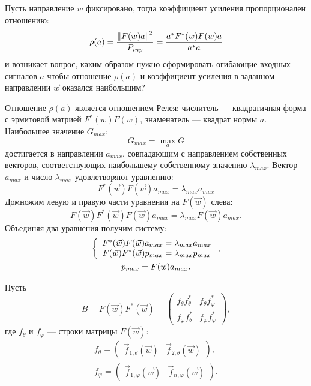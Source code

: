 Пусть направление $w$ фиксировано, тогда коэффициент усиления пропорционален отношению:
\[
    \rho(a)
    = \frac{\left \| F(w) a \right \|^2}{P_{inp}}
    = \frac{a^* F^*(w) F(w) a}{a^* a}
\]
и возникает вопрос, каким образом нужно сформировать огибающие входных сигналов $a$ чтобы отношение $\rho(a)$ и коэффициент усиления в заданном направлении $\vec{w}$
оказался наибольшим?

Отношение $\rho(a)$ является отношением Релея: числитель --- квадратичная форма с эрмитовой матрией $F^*(w) F(w)$, знаменатель --- квадрат нормы $a$.
Наибольшее значение $G_{max}$:
\[
    G_{max} = \max \limits_{a} G
\]
достигается в направлении $a_{max}$, совпадающим с направлением собственных векторов, соответствующих наибольшему собственному значению $\lambda_{max}$.
Вектор $a_{max}$ и число $\lambda_{max}$ удовлетворяют уравнению:
\[
    F^*(\vec{w}) F(\vec{w}) a_{max} = \lambda_{max} a_{max}
\]
Домножим левую и правую части уравнения на $F(\vec{w})$ слева:
\[
    F(\vec{w}) F^*(\vec{w}) F(\vec{w}) a_{max} = \lambda_{max} F(\vec{w}) a_{max} .
\]
Объединяя два уравнения получим систему:
\begin{gather}
    \left \{
    \begin{array}{c}
        F^*(\vec{w}) F(\vec{w}) a_{max} = \lambda_{max} a_{max} \\
        F(\vec{w}) F^*(\vec{w}) p_{max} = \lambda_{max} p_{max}
    \end{array}
    \right .
    \label{emission:emitter:gain:system}, \\
    p_{max} = F(\vec{w}) a_{max} \notag.
\end{gather}

Пусть
\[
    B
    = F(\vec{w}) F^*(\vec{w})
    = \begin{pmatrix}
          f_\theta f_\theta^*  & f_{\theta} f_\varphi^* \\
          f_\varphi f_\theta^* & f_\varphi f_\varphi^*
    \end{pmatrix} ,
\]
где $f_\theta$ и $f_\varphi$ --- строки матрицы $F(\vec{w})$:
\begin{gather*}
    f_\theta
    = \begin{pmatrix}
          \vec{f}_{1,\theta}(\vec{w}) & \vec{f}_{2,\theta}(\vec{w})
    \end{pmatrix}, \\
    f_\varphi
    = \begin{pmatrix}
          \vec{f}_{1,\varphi}(\vec{w}) & \vec{f}_{n,\varphi}(\vec{w})
    \end{pmatrix} .
\end{gather*}

